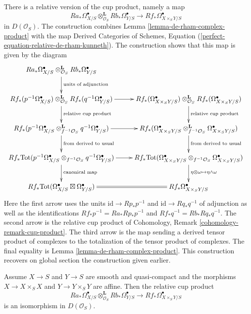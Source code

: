 \noindent
There is a relative version of the cup product, namely a map
$$
Ra_*\Omega^\bullet_{X/S}
\otimes_{\mathcal{O}_S}^\mathbf{L}
Rb_*\Omega^\bullet_{Y/S}
\longrightarrow
Rf_*\Omega^\bullet_{X \times_S Y/S}
$$
in $D(\mathcal{O}_S)$. The construction combines
Lemma \ref{lemma-de-rham-complex-product} with the map
Derived Categories of Schemes, Equation
(\ref{perfect-equation-relative-de-rham-kunneth}).
The construction shows that this map is given by the diagram
$$
\xymatrix{
Ra_*\Omega^\bullet_{X/S}
\otimes_{\mathcal{O}_S}^\mathbf{L}
Rb_*\Omega^\bullet_{Y/S}
\ar[d]^{\text{units of adjunction}}  \\
Rf_*(p^{-1}\Omega^\bullet_{X/S})
\otimes_{\mathcal{O}_S}^\mathbf{L}
Rf_*(q^{-1}\Omega^\bullet_{Y/S}) \ar[r] \ar[d]^{\text{relative cup product}} &
Rf_*(\Omega^\bullet_{X \times_S Y/S})
\otimes_{\mathcal{O}_S}^\mathbf{L}
Rf_*(\Omega^\bullet_{X \times_S Y/S}) \ar[d]^{\text{relative cup product}} \\
Rf_*(p^{-1}\Omega^\bullet_{X/S}
\otimes_{f^{-1}\mathcal{O}_S}^\mathbf{L}
q^{-1}\Omega^\bullet_{Y/S})
\ar[d]^{\text{from derived to usual}} \ar[r] &
Rf_*(\Omega^\bullet_{X \times_S Y/S}
\otimes_{f^{-1}\mathcal{O}_S}^\mathbf{L}
\Omega^\bullet_{X \times_S Y/S})
\ar[d]^{\text{from derived to usual}} \\
Rf_*\text{Tot}(p^{-1}\Omega^\bullet_{X/S}
\otimes_{f^{-1}\mathcal{O}_S}
q^{-1}\Omega^\bullet_{Y/S}) \ar[r] \ar[d]^{\text{canonical map}} &
Rf_*\text{Tot}(\Omega^\bullet_{X \times_S Y/S}
\otimes_{f^{-1}\mathcal{O}_S}
\Omega^\bullet_{X \times_S Y/S})
\ar[d]^{\eta \otimes \omega \mapsto \eta \wedge \omega} \\
Rf_*\text{Tot}(\Omega^\bullet_{X/S} \boxtimes \Omega^\bullet_{Y/S})
\ar@{=}[r]
&
Rf_*\Omega^\bullet_{X \times_S Y/S}
}
$$
Here the first arrow uses the units $\text{id} \to Rp_* p^{-1}$
and $\text{id} \to Rq_* q^{-1}$ of adjunction as well as the
identifications $Rf_* p^{-1} = Ra_* Rp_* p^{-1}$ and
$Rf_* q^{-1} = Rb_* Rq_* q^{-1}$.
The second arrow is the relative cup product of
Cohomology, Remark \ref{cohomology-remark-cup-product}.
The third arrow is the map sending a derived tensor product
of complexes to the totalization of the tensor product of complexes.
The final equality is Lemma \ref{lemma-de-rham-complex-product}.
This construction recovers on global section the construction given earlier.

\begin{lemma}
\label{lemma-kunneth-de-rham-relative}
Assume $X \to S$ and $Y \to S$ are smooth and quasi-compact
and the morphisms $X \to X \times_S X$ and $Y \to Y \times_S Y$ are affine.
Then the relative cup product
$$
Ra_*\Omega^\bullet_{X/S}
\otimes_{\mathcal{O}_S}^\mathbf{L}
Rb_*\Omega^\bullet_{Y/S}
\longrightarrow
Rf_*\Omega^\bullet_{X \times_S Y/S}
$$
is an isomorphism in $D(\mathcal{O}_S)$.
\end{lemma}


